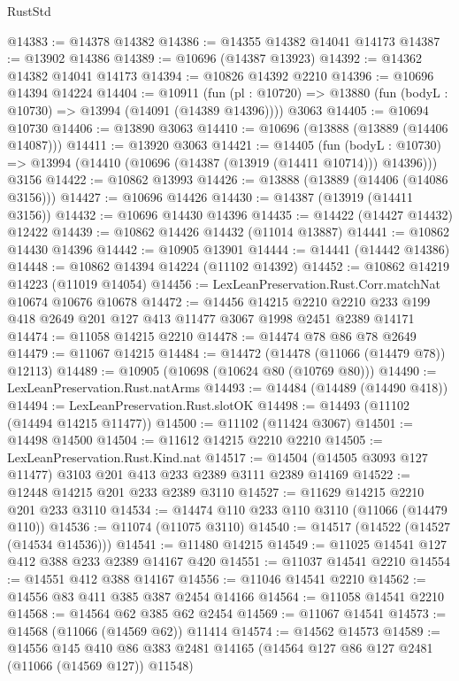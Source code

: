 \begin{lexlean}{RustStd}
\begin{coremodule}
@14383 := @14378 @14382
@14386 := @14355 @14382 @14041 @14173
@14387 := @13902 @14386
@14389 := @10696 (@14387 @13923)
@14392 := @14362 @14382 @14041 @14173
@14394 := @10826 @14392 @2210
@14396 := @10696 @14394 @14224
@14404 := @10911
    (fun (pl : @10720) => @13880 (fun (bodyL : @10730) => @13994 (@14091 (@14389 @14396))))
    @3063
@14405 := @10694 @10730
@14406 := @13890 @3063
@14410 := @10696 (@13888 (@13889 (@14406 @14087)))
@14411 := @13920 @3063
@14421 := @14405
    (fun (bodyL : @10730) => @13994 (@14410 (@10696 (@14387 (@13919 (@14411 @10714))) @14396)))
    @3156
@14422 := @10862 @13993
@14426 := @13888 (@13889 (@14406 (@14086 @3156)))
@14427 := @10696 @14426
@14430 := @14387 (@13919 (@14411 @3156))
@14432 := @10696 @14430 @14396
@14435 := @14422 (@14427 @14432) @12422
@14439 := @10862 @14426 @14432 (@11014 @13887)
@14441 := @10862 @14430 @14396
@14442 := @10905 @13901
@14444 := @14441 (@14442 @14386)
@14448 := @10862 @14394 @14224 (@11102 @14392)
@14452 := @10862 @14219 @14223 (@11019 @14054)
@14456 := LexLeanPreservation.Rust.Corr.matchNat @10674 @10676 @10678
@14472 := @14456
    @14215
    @2210
    @2210
    @233
    @199
    @418
    @2649
    @201
    @127
    @413
    @11477
    @3067
    @1998
    @2451
    @2389
    @14171
@14474 := @11058 @14215 @2210
@14478 := @14474 @78 @86 @78 @2649
@14479 := @11067 @14215
@14484 := @14472 (@14478 (@11066 (@14479 @78)) @12113)
@14489 := @10905 (@10698 (@10624 @80 (@10769 @80)))
@14490 := LexLeanPreservation.Rust.natArms
@14493 := @14484 (@14489 (@14490 @418))
@14494 := LexLeanPreservation.Rust.slotOK
@14498 := @14493 (@11102 (@14494 @14215 @11477))
@14500 := @11102 (@11424 @3067)
@14501 := @14498 @14500
@14504 := @11612 @14215 @2210 @2210
@14505 := LexLeanPreservation.Rust.Kind.nat
@14517 := @14504 (@14505 @3093 @127 @11477) @3103 @201 @413 @233 @2389 @3111 @2389 @14169
@14522 := @12448 @14215 @201 @233 @2389 @3110
@14527 := @11629 @14215 @2210 @201 @233 @3110
@14534 := @14474 @110 @233 @110 @3110 (@11066 (@14479 @110))
@14536 := @11074 (@11075 @3110)
@14540 := @14517 (@14522 (@14527 (@14534 @14536)))
@14541 := @11480 @14215
@14549 := @11025 @14541 @127 @412 @388 @233 @2389 @14167 @420
@14551 := @11037 @14541 @2210
@14554 := @14551 @412 @388 @14167
@14556 := @11046 @14541 @2210
@14562 := @14556 @83 @411 @385 @387 @2454 @14166
@14564 := @11058 @14541 @2210
@14568 := @14564 @62 @385 @62 @2454
@14569 := @11067 @14541
@14573 := @14568 (@11066 (@14569 @62)) @11414
@14574 := @14562 @14573
@14589 := @14556
    @145
    @410
    @86
    @383
    @2481
    @14165
    (@14564 @127 @86 @127 @2481 (@11066 (@14569 @127)) @11548)

\end{coremodule}
\end{lexlean}
